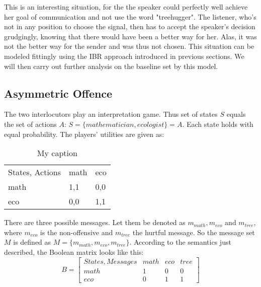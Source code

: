 \documentclass{article}
\begin{document}
This is an interesting situation, for the the speaker could perfectly well achieve her goal of communication and not use the word "treehugger". The listener, who's not in any position to choose the signal, then has to accept the speaker's decision grudgingly, knowing that there would have been a better way for her. Alas, it was not the better way for the sender and was thus not chosen. This situation can be modeled fittingly using the IBR approach introduced in previous sections. We will then carry out further analysis on the baseline set by this model.
\subsection{Asymmetric Offence}
The two interlocutors play an interpretation game. Thus set of states $S$ equals the set of actions $A$: $S=\{mathematician,ecologist\}=A$. Each state holds with equal probability. The players' utilities are given as:\\

\begin{table}[h]
\centering
\caption{My caption}
\label{my-label}
\begin{tabular}{lll}
States, Actions & math & eco \\
math            & 1,1  & 0,0 \\
eco             & 0,0  & 1,1
\end{tabular}
\end{table}

There are three possible messages. Let them be denoted as $m_{math},m_{eco}$ and $m_{tree}$, where $m_{eco}$ is the non-offensive and $m_{tree}$ the hurtful message. So the message set $M$ is defined as $M=\{m_{math},m_{eco},m_{tree}\}$. According to the semantics just described, the Boolean matrix looks like this:\\
\begin{equation*}
B =
\begin{bmatrix}

States, Messages & math & eco & tree \\
math             & 1    & 0   & 0    \\
eco              & 0    & 1   & 1   
\end{bmatrix}
\end{equation*}
\end{document}
